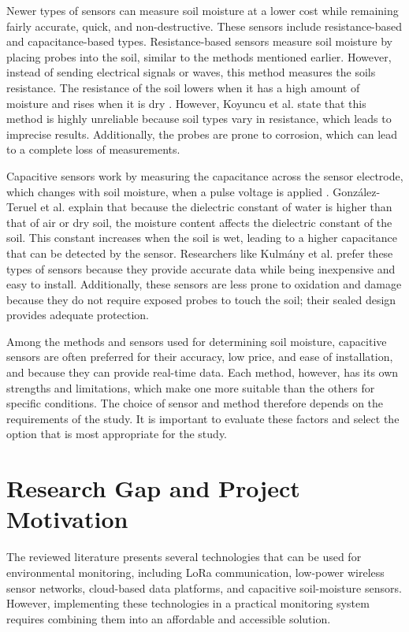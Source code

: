 Newer types of sensors can measure soil moisture at a lower cost while
remaining fairly accurate, quick, and non-destructive. These sensors include
resistance-based and capacitance-based types. Resistance-based sensors
measure soil moisture by placing probes into the soil, similar to the
methods mentioned earlier. However, instead of sending electrical
signals or waves, this method measures the soil\textquotesingle s
resistance. The resistance of the soil lowers when it has a high amount
of moisture and rises when it is dry \cite{ref31}\cite{ref32}. However, Koyuncu
et al. \cite{ref28} state that this method is highly unreliable because
soil types vary in resistance, which leads to imprecise results.
Additionally, the probes are prone to corrosion, which can lead to a
complete loss of measurements.

Capacitive sensors work by measuring the capacitance across the sensor
electrode, which changes with soil moisture, when a pulse voltage is applied
\cite{ref33}\cite{ref34}. González-Teruel et al. \cite{ref35} explain that because
the dielectric constant of water is higher than that of air or dry soil,
the moisture content affects the dielectric constant of the soil. This
constant increases when the soil is wet, leading to a higher capacitance that
can be detected by the sensor. Researchers like Kulmány et al. \cite{ref36}
prefer these types of sensors because they provide accurate data while
being inexpensive and easy to install. Additionally, these sensors are
less prone to oxidation and damage because they do not require exposed
probes to touch the soil; their sealed design provides adequate
protection.

Among the methods and sensors used for determining soil moisture,
capacitive sensors are often preferred for their accuracy, low price, and
ease of installation, and because they can provide real-time data.
Each method, however, has its own strengths and limitations, which make one
more suitable than the others for specific conditions.
The choice of sensor and method therefore depends on the requirements of the study.
It is important to evaluate these factors and select the option that is most
appropriate for the study.

\section{\texorpdfstring{Research Gap and Project Motivation}{Research Gap and Project Motivation}}

The reviewed literature presents several technologies that can be used for environmental monitoring, including LoRa communication, low-power wireless sensor networks, cloud-based data platforms, and capacitive soil-moisture sensors. However, implementing these technologies in a practical monitoring system requires combining them into an affordable and accessible solution.

